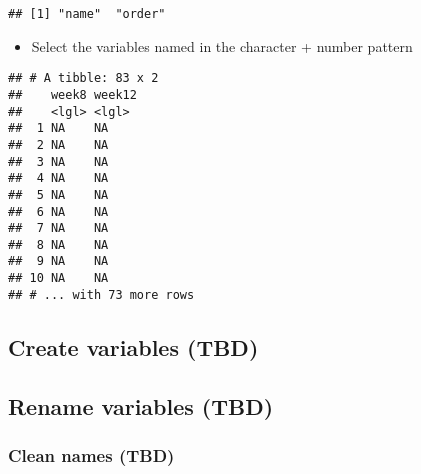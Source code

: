 \documentclass[
]{book}
\newenvironment{Shaded}{\begin{snugshade}}{\end{snugshade}}
\newcommand{\DecValTok}[1]{\textcolor[rgb]{0.00,0.00,0.81}{#1}}
\newcommand{\KeywordTok}[1]{\textcolor[rgb]{0.13,0.29,0.53}{\textbf{#1}}}
\newcommand{\NormalTok}[1]{#1}
\newcommand{\OperatorTok}[1]{\textcolor[rgb]{0.81,0.36,0.00}{\textbf{#1}}}
\newcommand{\OtherTok}[1]{\textcolor[rgb]{0.56,0.35,0.01}{#1}}
\newcommand{\StringTok}[1]{\textcolor[rgb]{0.31,0.60,0.02}{#1}}
\providecommand{\tightlist}{%
  \setlength{\itemsep}{0pt}\setlength{\parskip}{0pt}}
\begin{document}
\begin{verbatim}
## [1] "name"  "order"
\end{verbatim}

\begin{itemize}
\tightlist
\item
  Select the variables named in the character + number pattern
\end{itemize}

\begin{Shaded}
\end{Shaded}

\begin{verbatim}
## # A tibble: 83 x 2
##    week8 week12
##    <lgl> <lgl> 
##  1 NA    NA    
##  2 NA    NA    
##  3 NA    NA    
##  4 NA    NA    
##  5 NA    NA    
##  6 NA    NA    
##  7 NA    NA    
##  8 NA    NA    
##  9 NA    NA    
## 10 NA    NA    
## # ... with 73 more rows
\end{verbatim}

\hypertarget{create-variables-tbd}{%
\subsection{Create variables (TBD)}\label{create-variables-tbd}}

\hypertarget{rename-variables-tbd}{%
\subsection{Rename variables (TBD)}\label{rename-variables-tbd}}

\hypertarget{clean-names-tbd}{%
\subsubsection{Clean names (TBD)}\label{clean-names-tbd}}
\end{document}
